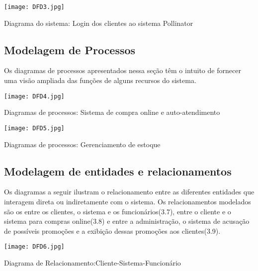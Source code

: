 	 \begin{table}[H]
	 \begin{center}
	    \texttt{[image: DFD3.jpg]}
	    \caption{Diagrama do sistema: Login dos clientes ao sistema Pollinator } \label{tab:DFD3}
	 \end{center}
	 \end{table} 
	 
\subsection{Modelagem de Processos}
 	Os diagramas de processos apresentados nessa seção têm o intuito de fornecer uma
visão ampliada das funções de alguns recursos do sistema.

	\begin{table}[H]
	 \begin{center}
	    \texttt{[image: DFD4.jpg]}
	    \caption{Diagramas de processos: Sistema de compra online e auto-atendimento} 
	 	\label{tab:DFD4}
	 \end{center}
	 \end{table} 
	 
	 \begin{table}[H]
	 \begin{center}
	    \texttt{[image: DFD5.jpg]}
	    \caption{Diagramas de processos: Gerenciamento de estoque } 						\label{tab:DFD5}
	 \end{center}
	 \end{table} 
	 

\subsection{Modelagem de entidades e relacionamentos}
	Os diagramas a seguir ilustram o relacionamento entre as diferentes entidades que interagem direta ou indiretamente com o sistema. Os relacionamentos modelados são os entre os clientes, o sistema e os funcionários(3.7), entre o cliente e o sistema para compras online(3.8) e entre a administração, o sistema de acusação de possíveis promoções e a exibição dessas promoções aos clientes(3.9).
	\begin{table}[H]
	 \begin{center}
	    \texttt{[image: DFD6.jpg]}
	    \caption{Diagrama de Relacionamento:Cliente-Sistema-Funcionário} 		
	    \label{tab:DFD6}
	 \end{center}
	 \end{table} 
	 
